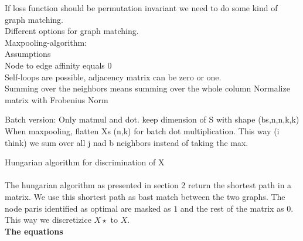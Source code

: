 If loss function should be permutation invariant we need to do some kind of graph matching.\\
Different options for graph matching.\\
Maxpooling-algorithm:\\
Assumptions\\
Node to edge affinity equals 0\\

Self-loops are possible, adjacency matrix can be zero or one.\\

Summing over the neighbors means summing over the whole column
Normalize matrix with Frobenius Norm

Batch version:
Only matmul and dot. keep dimension of S with shape (bs,n,n,k,k)
When maxpooling, flatten Xs (n,k) for batch dot multiplication. This way (i think) we sum over all j nad b neighbors instead of taking the max.  


Hungarian algorithm for discrimination of X \\
\\
The hungarian algorithm as presented in section 2 return the shortest path in a matrix. We use this shortest path as bast match between the two graphs. The node paris identified as optimal are masked as $1$ and the rest of the matrix as $0$. This way we discretizice $X\star$ to $X$. 
\\
\textbf{The equations}

